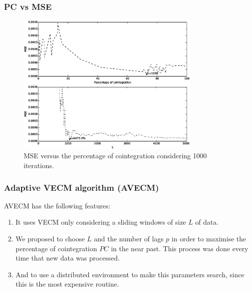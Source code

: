 \documentclass{beamer}
\begin{document}
\begin{frame}
\begin{columns}
\begin{column}{0.3\textwidth}
\begin{figure}[!h]
 \end{figure}
\end{column}
\end{columns}
\end{frame}


\begin{frame}
\frametitle{PC vs MSE}
\begin{figure}[ht!]
  \centering
  \includegraphics[width=0.8\textwidth]{img/51_Fig2}
  \caption{MSE versus the percentage of cointegration considering 1000
  iterations. }
  \label{fig:cointvsmse}
\end{figure}
\end{frame}

\begin{frame}
\frametitle{Adaptive VECM algorithm (AVECM)}
AVECM has the following features: 
\begin{enumerate}
\item It uses VECM only considering a sliding windows of size $L$ of data.
\item We proposed to choose $L$ and the number of lags $p$ in order to maximise the percentage of cointegration $PC$ in the near past. This process was done every time that new data was processed. 
\item And to use a distributed environment to make this parameters search, since this is the most expensive routine.
\end{enumerate}
\end{frame}
\end{document}
